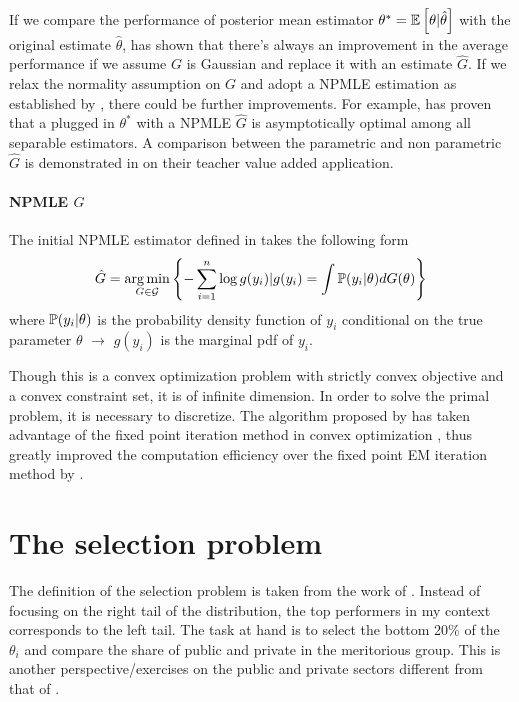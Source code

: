 \documentclass[12pt]{article}
\begin{document}
If we compare the performance of posterior mean estimator
$\theta^*=\mathbb{E}\left[\theta|\hat{\theta}\right]$ with the original estimate
$\hat{\theta}$, \citet{james1992estimation} has shown that there's always an
improvement in the average performance if we assume $G$ is Gaussian and replace
it with an estimate $\hat{G}$. If we relax the normality assumption on $G$ and
adopt a NPMLE estimation as established by \citet{kiefer1956consistency}, there
could be further improvements. For example, \citet{jiang2009general} has proven
that a plugged in $\theta^*$ with a NPMLE $\hat{G}$ is asymptotically optimal
among all separable estimators. A comparison between the parametric and non
parametric $\hat{G}$ is demonstrated in \citet{gilraine2020new} on their
teacher value added application.

\paragraph{NPMLE $G$}

The initial NPMLE estimator defined in \citet{kiefer1956consistency} takes the
following form
\begin{equation*}
    \hat{G}=\operatorname*{arg\,min}_{G\in \mathcal{G}} \left\{-\sum_{i=1}^{n}\log g(y_i)|g(y_i)=\int  \mathbb{P}(y_i |\theta)dG(\theta) \right\}
\end{equation*}
where $\mathbb{P}(y_i |\theta)$ is the probability density function of $y_i$ conditional on the true parameter $\theta$ $\longrightarrow$ $g(y_i)$ is the marginal pdf of $y_i$.

Though this is a convex optimization problem with strictly convex objective and
a convex constraint set, it is of infinite dimension. In order to solve the
primal problem, it is necessary to discretize. The algorithm proposed by
\citet{koenker2014convex} has taken advantage of the fixed point iteration
method in convex optimization \citep{andersen2010mosek}, thus greatly improved
the computation efficiency over the fixed point EM iteration method by
\citet{jiang2009general}.

\section{The selection problem}
The definition of the selection problem is taken from the work of
\citet{gu2023invidious}. Instead of focusing on the right tail of the
distribution, the top performers in my context corresponds to the left tail.
The task at hand is to select the bottom 20\% of the $\theta_i$ and compare the
share of public and private in the meritorious group. This is another
perspective/exercises on the public and private sectors different from that of
\citet{croiset2024hospitals}.
\end{document}

